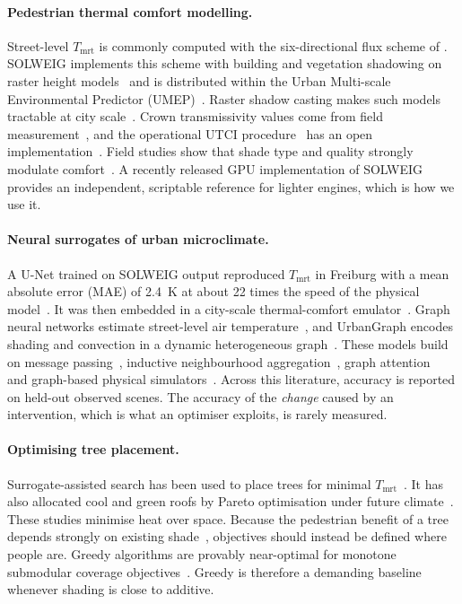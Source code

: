 \documentclass[preprint,12pt,authoryear]{elsarticle}
\newcommand{\tmrt}{\ensuremath{T_\mathrm{mrt}}}
\begin{document}
\paragraph{Pedestrian thermal comfort modelling.}
Street-level \tmrt{} is commonly computed with the six-directional flux scheme of \citet{thorsson2007}. SOLWEIG implements this scheme with building and vegetation shadowing on raster height models~\citep{lindberg2008,lindberg2011} and is distributed within the Urban Multi-scale Environmental Predictor (UMEP)~\citep{lindberg2018}. Raster shadow casting makes such models tractable at city scale~\citep{ratti2004}. Crown transmissivity values come from field measurement~\citep{konarska2014}, and the operational UTCI procedure~\citep{brode2012} has an open implementation~\citep{tartarini2020}. Field studies show that shade type and quality strongly modulate comfort~\citep{middel2016,middel2021}. A recently released GPU implementation of SOLWEIG~\citep{kamath2026} provides an independent, scriptable reference for lighter engines, which is how we use it.

\paragraph{Neural surrogates of urban microclimate.}
A U-Net trained on SOLWEIG output reproduced \tmrt{} in Freiburg with a mean absolute error (MAE) of 2.4~K at about 22 times the speed of the physical model~\citep{briegel2023}. It was then embedded in a city-scale thermal-comfort emulator~\citep{briegel2024}. Graph neural networks estimate street-level air temperature~\citep{yu2024}, and UrbanGraph encodes shading and convection in a dynamic heterogeneous graph~\citep{xin2025}. These models build on message passing~\citep{gilmer2017}, inductive neighbourhood aggregation~\citep{hamilton2017}, graph attention~\citep{brody2022} and graph-based physical simulators~\citep{pfaff2021}. Across this literature, accuracy is reported on held-out observed scenes. The accuracy of the \emph{change} caused by an intervention, which is what an optimiser exploits, is rarely measured.

\paragraph{Optimising tree placement.}
Surrogate-assisted search has been used to place trees for minimal \tmrt{}~\citep{schrodi2023}. It has also allocated cool and green roofs by Pareto optimisation under future climate~\citep{kim2025}. These studies minimise heat over space. Because the pedestrian benefit of a tree depends strongly on existing shade~\citep{lachapelle2023}, objectives should instead be defined where people are. Greedy algorithms are provably near-optimal for monotone submodular coverage objectives~\citep{nemhauser1978}. Greedy is therefore a demanding baseline whenever shading is close to additive.
\end{document}
